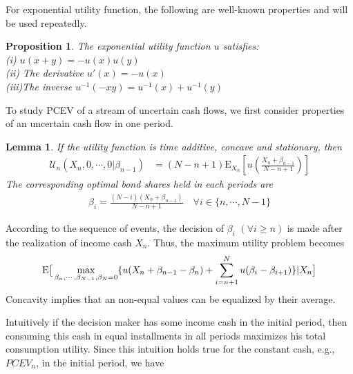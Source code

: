 \documentclass{article}[12pt letter]
\newtheorem{lemma}[theorem]{Lemma}
\newtheorem{proposition}[theorem]{Proposition}
\newcommand{\E}{\mathrm{E}}
\begin{document}
For exponential utility function, the following are well-known properties and will be used repeatedly. 
\begin{proposition} \label{prop:exp}
The exponential utility function $u$ satisfies: \\
(i) $u(x+y) = -u(x)u(y)$ \\
(ii) The derivative $u' (x) = -u(x)$ \\
(iii)The inverse $u^{-1}(-xy) = u^{-1} (x) + u^{-1} (y)$
\end{proposition}

To study PCEV of a stream of uncertain cash flows,  we first consider properties of an uncertain cash flow in one  period.
\begin{lemma} \label{lem:randomX_n}
If the utility function is time additive, concave and stationary, then
\begin{align}
 \mathcal{U}_n(X_n,0, \cdots, 0|\beta_{n-1}) &=(N-n+1) \E_{X_n} [u(\frac{X_n+\beta_{n-1}}{N-n+1})]
\end{align}
The corresponding optimal bond shares held in each periods are
\begin{align} \label{eqn:beta_iOpt}
\beta_i = \frac{(N-i)(X_n+ \beta_{n-1})}{N-n+1} \quad \forall i \in \{n, \cdots, N-1\}
\end{align}
\end{lemma}
\proof According to the sequence of events, the decision of $\beta_i $ $(\forall i \geq n) $ is made after the realization of income cash $X_n$. Thus,  the maximum utility problem becomes
\begin{align*}
\E\big{[}\max_{\beta_n, \cdots, \beta_{N-1}, \beta_N = 0} \{u(X_n +\beta_{n-1} - \beta_n) + \sum_{i=n+1}^N u(\beta_i - \beta_{i+1})\}|X_n\big{]}
\end{align*}
Concavity implies that an non-equal values can be equalized by their average. 
\endproof

Intuitively if the decision maker has some income cash in the initial period, then  consuming this cash in equal installments in all periods maximizes his total consumption utility. Since this intuition holds true for the constant cash, e.g., $PCEV_n$, in the initial period, we have
\end{document}
